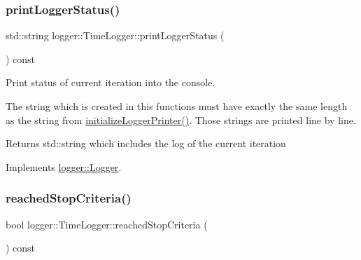 \mbox{\label{classlogger_1_1_time_logger_ad98f34f3584b2ac448d6a5ef69ee2af1}} 
\subsubsection{\texorpdfstring{print\+Logger\+Status()}{printLoggerStatus()}}
{\footnotesize\ttfamily std\+::string logger\+::\+Time\+Logger\+::print\+Logger\+Status (\begin{DoxyParamCaption}{ }\end{DoxyParamCaption}) const\hspace{0.3cm}{\ttfamily [virtual]}}



Print status of current iteration into the console. 

The string which is created in this functions must have exactly the same length as the string from {\ttfamily \mbox{\hyperlink{classlogger_1_1_time_logger_a60f041a21157b1049f512d325c3d35ac}{initialize\+Logger\+Printer()}}}. Those strings are printed line by line.

\begin{DoxyReturn}{Returns}
{\ttfamily std\+::string} which includes the log of the current iteration 
\end{DoxyReturn}


Implements \mbox{\hyperlink{classlogger_1_1_logger_abad818a7e8053ca84cb267e883b5e377}{logger\+::\+Logger}}.

\mbox{\label{classlogger_1_1_time_logger_a380f7e56af17c8a35d729dad1a5e3baa}} 
\subsubsection{\texorpdfstring{reached\+Stop\+Criteria()}{reachedStopCriteria()}}
{\footnotesize\ttfamily bool logger\+::\+Time\+Logger\+::reached\+Stop\+Criteria (\begin{DoxyParamCaption}{ }\end{DoxyParamCaption}) const\hspace{0.3cm}{\ttfamily [virtual]}}



